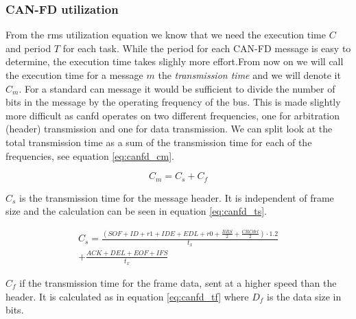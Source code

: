 

\subsubsection{CAN-FD utilization}

From the \acrshort{rms} utilization equation we know that we need the execution time $C$ and period $T$ for each task. While the period for each CAN-FD message is easy to determine, the execution time takes slighly more effort.From now on we will call the execution time for a message $m$ the \emph{transmission time} and we will denote it $C_m$. For a standard \acrshort{can} message it would be sufficient to divide the number of bits in the message by the operating frequency of the bus. This is made slightly more difficult as \acrshort{canfd} operates on two different frequencies, one for arbitration (header) transmission and one for data transmission. We can split look at the total transmission time as a sum of the transmission time for each of the frequencies, see equation \ref{eq:canfd_cm}.  

\begin{equation}
    C_m=C_s+C_f
    \label{eq:canfd_cm}
\end{equation}

$C_s$ is the transmission time for the message header. It is independent of frame size and the calculation can be seen in equation \ref{eq:canfd_ts}.

\begin{equation}
    \begin{gathered}
        C_s=\frac{(SOF+ID+r1+IDE+EDL+r0+\frac{BRS}{2}+\frac{CRCdel}{2})\cdot1.2}{t_x}\\+\frac{ACK+DEL+EOF+IFS}{t_x}
    \end{gathered}
    \label{eq:canfd_ts}
\end{equation}

$C_f$ if the transmission time for the frame data, sent at a higher speed than the header. It is calculated as in equation \ref{eq:canfd_tf} where $D_f$ is the data size in bits.

